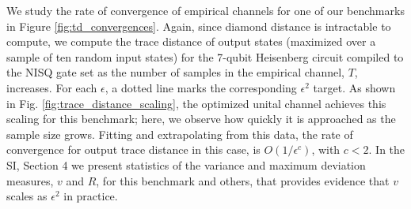 We study the rate of convergence of empirical channels for one of our benchmarks in Figure \ref{fig:td_convergences}. Again, since diamond distance is intractable to compute, we compute the trace distance of output states (maximized over a sample of ten random input states) for the 7-qubit Heisenberg circuit compiled to the NISQ gate set as the number of samples in the empirical channel, $T$, increases. For each $\epsilon$, a dotted line marks the corresponding $\epsilon^2$ target.  
As shown in Fig. \ref{fig:trace_distance_scaling}, the optimized unital channel achieves this scaling for this benchmark; here, we observe how quickly it is approached as the sample size grows. Fitting and extrapolating from this data, the rate of convergence for output trace distance in this case, is $O(1/\epsilon^c)$, with $c<2$. In the SI, Section 4 we present statistics of the variance and maximum deviation measures, $v$ and $R$, for this benchmark and others, that provides evidence that $v$ scales as $\epsilon^2$ in practice.